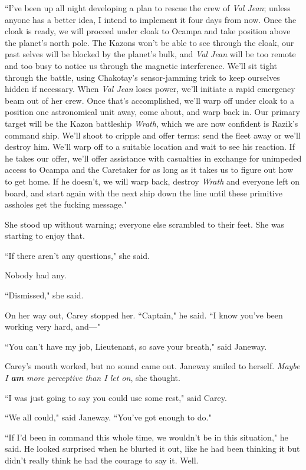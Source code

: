 \documentclass[twoside,letterpaper,12pt]{memoir}
\begin{document}
``I've been up all night developing a plan to rescue the crew of \textit{Val Jean}; unless anyone has a better idea, I intend to implement it four days from now. Once the cloak is ready, we will proceed under cloak to Ocampa and take position above the planet's north pole. The Kazons won't be able to see through the cloak, our past selves will be blocked by the planet's bulk, and \textit{Val Jean} will be too remote and too busy to notice us through the magnetic interference. We'll sit tight through the battle, using Chakotay's sensor-jamming trick to keep ourselves hidden if necessary. When \textit{Val Jean} loses power, we'll initiate a rapid emergency beam out of her crew. Once that's accomplished, we'll warp off under cloak to a position one astronomical unit away, come about, and warp back in. Our primary target will be the Kazon battleship \textit{Wrath}, which we are now confident is Razik's command ship. We'll shoot to cripple and offer terms: send the fleet away or we'll destroy him. We'll warp off to a suitable location and wait to see his reaction. If he takes our offer, we'll offer assistance with casualties in exchange for unimpeded access to Ocampa and the Caretaker for as long as it takes us to figure out how to get home. If he doesn't, we will warp back, destroy \textit{Wrath} and everyone left on board, and start again with the next ship down the line until these primitive assholes get the fucking message." 

She stood up without warning; everyone else scrambled to their feet. She was starting to enjoy that. 

``If there aren't any questions," she said. 

Nobody had any. 

``Dismissed," she said. 

On her way out, Carey stopped her. ``Captain," he said. ``I know you've been working very hard, and---" 

``You can't have my job, Lieutenant, so save your breath," said Janeway. 

Carey's mouth worked, but no sound came out. Janeway smiled to herself. \textit{Maybe I \textbf{am} more perceptive than I let on}, she thought. 

``I was just going to say you could use some rest," said Carey. 

``We all could," said Janeway. ``You've got enough to do." 

``If I'd been in command this whole time, we wouldn't be in this situation," he said. He looked surprised when he blurted it out, like he had been thinking it but didn't really think he had the courage to say it. Well. 
\end{document}
